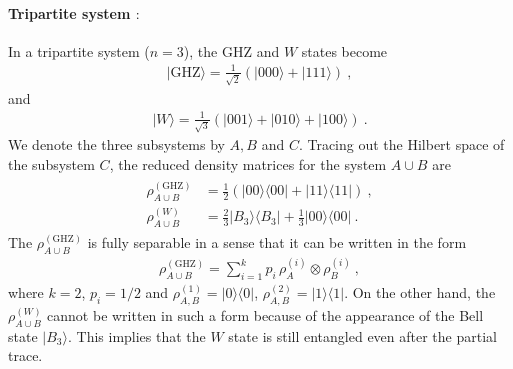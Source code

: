 \paragraph*{Tripartite system $:$}
In a tripartite system ($n=3$), the GHZ and $W$ states become
\begin{align}\label{GHZstate}
	|\text{GHZ}\rangle = \frac{1}{\sqrt{2}} \left( |000\rangle + |111\rangle \right) \ ,
\end{align}
and 
\begin{align}
	|W\rangle = \frac{1}{\sqrt{3}} \left( |001\rangle + |010\rangle + |100\rangle\right) \ .
\end{align}
We denote the three subsystems by $A,B$ and $C$. 
Tracing out the Hilbert space of the subsystem $C$, the reduced density matrices for the system $A\cup B$ are 
\begin{align}
	\begin{aligned}
		\rho_{A\cup B}^{(\text{GHZ})} &=\frac{1}{2}\left( |00\rangle \langle 00| + |11\rangle \langle 11| \right)\ , \\
		\rho_{A\cup B}^{(W)} &= \frac{2}{3}|B_3\rangle \langle B_3 | + \frac{1}{3} |00\rangle \langle 00|  \ .
	\end{aligned}
\end{align}
The $\rho_{A\cup B}^{(\text{GHZ})}$ is fully separable in a sense that it can be written in the form
\begin{align}
	\rho_{A\cup B}^{(\text{GHZ})} = \sum_{i=1}^k p_i \,\rho_A^{(i)} \otimes \rho_B^{(i)} \ ,
\end{align}
where $k=2$, $p_i = 1/2$ and $\rho_{A,B}^{(1)} = |0\rangle \langle  0|$, $\rho_{A,B}^{(2)} = |1 \rangle \langle1|$.
On the other hand, the $\rho_{A\cup B}^{(W)}$ cannot be written in such a form because of the appearance of the Bell state $|B_3\rangle$.
This implies that the $W$ state is still entangled even after the partial trace.


